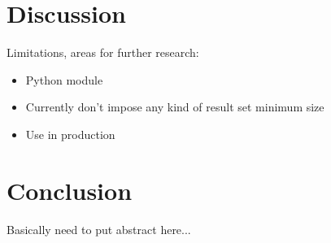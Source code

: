 \documentclass{article}
\begin{document}
\section{Discussion}

Limitations, areas for further research:

\begin{itemize}
    \item Python module
    \item Currently don't impose any kind of result set minimum size
    \item Use in production
\end{itemize}



\section{Conclusion}

Basically need to put abstract here...





\end{document}

